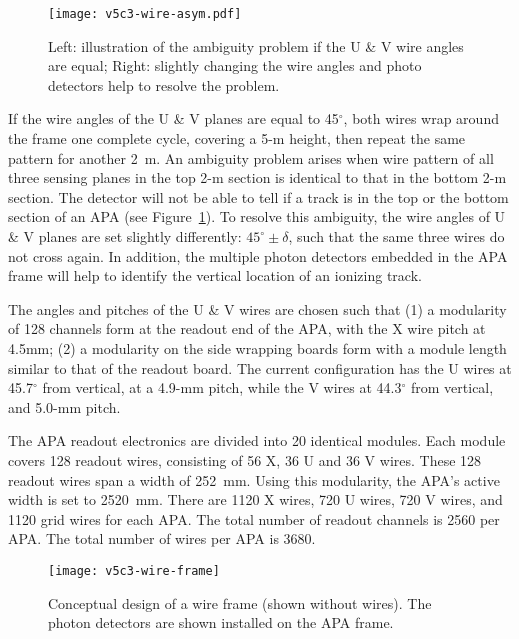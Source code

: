 \begin{figure}[htpb]
\centering
\texttt{[image: v5c3-wire-asym.pdf]}
\caption[Illustration of ambiguity problem if U \& V wire angles are equal]{Left: illustration of the ambiguity problem if the U \& V wire angles are equal; Right: slightly changing the wire angles and photo detectors help to resolve the problem. }
\label{fig:tpc-wire-asymmetry}
\end{figure}

If the wire angles of the U \& V planes are equal to 45$^\circ$, both wires wrap around the frame one complete cycle, covering a 5-m height, then repeat the same pattern for another 2~m.  An ambiguity problem arises when wire pattern of all three sensing planes in the top 2-m section is identical to that in the bottom 2-m section.  The detector will not be able to tell if a track is in the top or the bottom section of an APA (see Figure~\ref{fig:tpc-wire-asymmetry}).  To resolve this ambiguity, the wire angles of U \& V planes are set slightly differently: $45^\circ\pm\delta$, such that the same three wires do not cross again.   In addition, the multiple photon detectors embedded in the APA frame will help to identify the vertical location of an ionizing track.

The angles and pitches of the U \& V wires are chosen such that (1) a modularity of 128 channels form at the readout end of the APA, with the X wire pitch at 4.5mm; (2) a modularity on the side wrapping boards form with a module length similar to that of the readout board.  The current configuration has the U wires at 45.7$^{\circ}$ from vertical, at a 4.9-mm pitch, while the V wires at 44.3$^{\circ}$ from vertical, and 5.0-mm pitch.


The APA readout electronics are divided into 20 identical modules.  Each module covers 128
readout wires, consisting of 56 X, 36 U and 36 V wires. These 128 readout wires span a width 
of 252~mm.  Using this modularity, the APA's active width is set to 2520~mm. 
There are 1120 X wires, 720 U wires, 720 V wires, and 1120 grid 
wires for each APA.  The total number of readout channels is 2560 per APA. 
The total number of wires per APA is 3680.



\begin{figure}[htpb]
\centering
\texttt{[image: v5c3-wire-frame]}
\caption[Conceptual design of a wire frame]{Conceptual design of a wire frame (shown without wires). The photon detectors are shown installed on the APA frame. }
\label{fig:tpc-wire-frame}
\end{figure}

